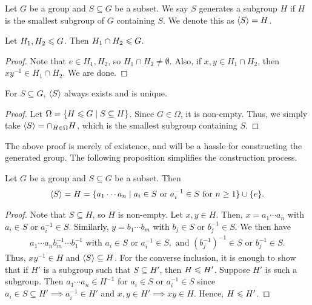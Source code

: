 \begin{definition}
    Let $G$ be a group and $S \subseteq G$ be a subset. We say $S$ generates a subgroup $H$ if $H$ is the smallest subgroup of $G$ containing $S$. We denote this as $\langle S\rangle = H$.
\end{definition}

\begin{remark}
    Let $H_{1},H_{2} \leqslant G$. Then $H_{1} \cap H_{2} \leqslant G$.
\end{remark}

\begin{proof}
    Note that $e \in H_{1}, H_{2}$, so $H_{1} \cap H_{2} \neq \emptyset$. Also, if $x,y \in H_{1} \cap H_{2}$, then $xy^{-1} \in H_{1} \cap H_{2}$. We are done.
\end{proof}

\begin{proposition}
    For $S \subseteq G$, $\langle S\rangle$ always exists and is unique.
\end{proposition}

\begin{proof}
    Let $\Omega = \{H \leqslant G \mid S \subseteq H\}$. Since $G \in \Omega$, it is non-empty. Thus, we simply take $\langle S\rangle = \cap_{H \in \Omega} H$, which is the smallest subgroup containing $S$.
\end{proof}

The above proof is merely of existence, and will be a hassle for constructing the generated group. The following proposition simplifies the construction process.

\begin{proposition}
    Let $G$ be a group and $S \subseteq G$ be a subset. Then
    \begin{align}
        \langle S\rangle = H = \{a_{1}\cdots a_{n} \mid a_{i} \in S \text{ or } a_{i}^{-1} \in S \text{ for } n \geq 1\} \cup \{e\}.
    \end{align}
\end{proposition}

\begin{proof}
    Note that $S \subseteq H$, so $H$ is non-empty. Let $x,y \in H$. Then, $x = a_{1} \cdots a_{n}$ with $a_{i} \in S$ or $a_{i}^{-1} \in S$. Similarly, $y = b_{1} \cdots b_{m}$ with $b_{j} \in S$ or $b_{j}^{-1} \in S$. We then have
    \begin{align}
        a_{1} \cdots a_{n} b_{m}^{-1} \cdots b_{1}^{-1} \text{ with } a_{i} \in S \text{ or } a_{i}^{-1} \in S, \text{ and } (b_{j}^{-1})^{-1} \in S \text{ or } b_{j}^{-1} \in S.
    \end{align}
    Thus, $xy^{-1} \in H$ and $\langle S\rangle \subseteq H$. For the converse inclusion, it is enough to show that if $H'$ is a subgroup such that $S \subseteq H'$, then $H \leqslant H'$. Suppose $H'$ is such a subgroup. Then $a_{1} \cdots a_{n} \in H^{-1}$ for $a_{i} \in S$ or $a_{i}^{-1} \in S$ since $a_{i} \in S \subseteq H' \implies a_{i}^{-1} \in H'$ and $x,y \in H' \implies xy \in H$. Hence, $H \leqslant H'$.
\end{proof}

